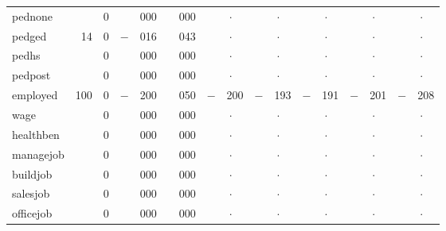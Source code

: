 \begin{table}[t]
\begin{center}
\begin{tabular}{lr@{.}lr@{.}lr@{.}lr@{.}lr@{.}lr@{.}lr@{.}lr@{.}l}
pednone      &     & 0 &   & 000 &   & 000 & \multicolumn{2}{c}{\ \ $\cdot$} & \multicolumn{2}{c}{\ \ $\cdot$} & \multicolumn{2}{c}{\ \ $\cdot$} & \multicolumn{2}{c}{\ \ $\cdot$} & \multicolumn{2}{c}{\ \ $\cdot$} \\
pedged       &  14 & 0 &$-$& 016 &   & 043 & \multicolumn{2}{c}{\ \ $\cdot$} & \multicolumn{2}{c}{\ \ $\cdot$} & \multicolumn{2}{c}{\ \ $\cdot$} & \multicolumn{2}{c}{\ \ $\cdot$} & \multicolumn{2}{c}{\ \ $\cdot$} \\
pedhs        &     & 0 &   & 000 &   & 000 & \multicolumn{2}{c}{\ \ $\cdot$} & \multicolumn{2}{c}{\ \ $\cdot$} & \multicolumn{2}{c}{\ \ $\cdot$} & \multicolumn{2}{c}{\ \ $\cdot$} & \multicolumn{2}{c}{\ \ $\cdot$} \\
pedpost        &     & 0 &   & 000 &   & 000 & \multicolumn{2}{c}{\ \ $\cdot$} & \multicolumn{2}{c}{\ \ $\cdot$} & \multicolumn{2}{c}{\ \ $\cdot$} & \multicolumn{2}{c}{\ \ $\cdot$} & \multicolumn{2}{c}{\ \ $\cdot$} \\
employed     & 100 & 0 &$-$& 200 &   & 050 &$-$& 200 &$-$& 193 &$-$& 191 &$-$& 201 &$-$& 208 \\
wage         &     & 0 &   & 000 &   & 000 & \multicolumn{2}{c}{\ \ $\cdot$} & \multicolumn{2}{c}{\ \ $\cdot$} & \multicolumn{2}{c}{\ \ $\cdot$} & \multicolumn{2}{c}{\ \ $\cdot$} & \multicolumn{2}{c}{\ \ $\cdot$} \\
healthben   &     & 0 &   & 000 &   & 000 & \multicolumn{2}{c}{\ \ $\cdot$} & \multicolumn{2}{c}{\ \ $\cdot$} & \multicolumn{2}{c}{\ \ $\cdot$} & \multicolumn{2}{c}{\ \ $\cdot$} & \multicolumn{2}{c}{\ \ $\cdot$} \\
managejob    &     & 0 &   & 000 &   & 000 & \multicolumn{2}{c}{\ \ $\cdot$} & \multicolumn{2}{c}{\ \ $\cdot$} & \multicolumn{2}{c}{\ \ $\cdot$} & \multicolumn{2}{c}{\ \ $\cdot$} & \multicolumn{2}{c}{\ \ $\cdot$} \\
buildjob    &     & 0 &   & 000 &   & 000 & \multicolumn{2}{c}{\ \ $\cdot$} & \multicolumn{2}{c}{\ \ $\cdot$} & \multicolumn{2}{c}{\ \ $\cdot$} & \multicolumn{2}{c}{\ \ $\cdot$} & \multicolumn{2}{c}{\ \ $\cdot$} \\
salesjob    &     & 0 &   & 000 &   & 000 & \multicolumn{2}{c}{\ \ $\cdot$} & \multicolumn{2}{c}{\ \ $\cdot$} & \multicolumn{2}{c}{\ \ $\cdot$} & \multicolumn{2}{c}{\ \ $\cdot$} & \multicolumn{2}{c}{\ \ $\cdot$} \\
officejob   &     & 0 &   & 000 &   & 000 & \multicolumn{2}{c}{\ \ $\cdot$} & \multicolumn{2}{c}{\ \ $\cdot$} & \multicolumn{2}{c}{\ \ $\cdot$} & \multicolumn{2}{c}{\ \ $\cdot$} & \multicolumn{2}{c}{\ \ $\cdot$} \\

\end{tabular}
\end{center}
\end{table}
